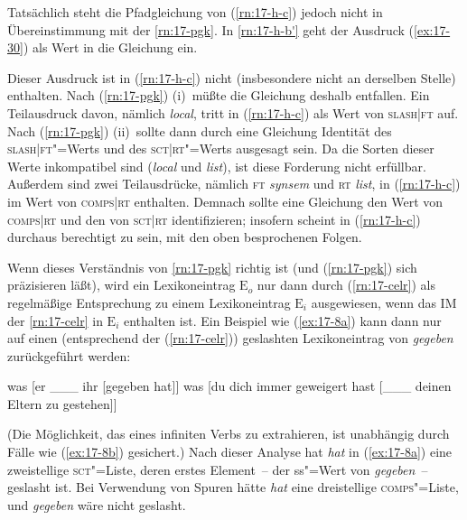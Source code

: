\documentclass[output=paper]{LSP/langsci}
\begin{document}
\randnum\label{rn:17-63}Tatsächlich steht die Pfadgleichung  von (\ref{rn:17-h-c}) jedoch nicht in Übereinstimmung mit der \eqref{rn:17-pgk}. In \eqref{rn:17-h-b'} geht der Ausdruck (\ref{ex:17-30}) als Wert in die Gleichung  ein.
\begin{exe}
\ex\label{ex:17-30}
\end{exe}
Dieser Ausdruck ist in (\ref{rn:17-h-c}) nicht (insbesondere nicht an derselben Stelle) enthalten. Nach (\ref{rn:17-pgk}) (i)~müßte die Gleichung  deshalb entfallen. Ein Teilausdruck davon, nämlich  {\glqq}\textit{local}{\grqq}, tritt in (\ref{rn:17-h-c}) als Wert von \textsc{slash|ft} auf. Nach (\ref{rn:17-pgk}) (ii)~sollte dann durch eine Gleichung  Identität des \textsc{slash|ft}"=Werts und des \textsc{sct|rt}"=Werts
ausgesagt sein. Da die Sorten dieser Werte inkompatibel sind (\textit{local} und \textit{list}), ist diese Forderung nicht erfüllbar. Außerdem sind zwei Teilausdrücke, nämlich {\glqq}\textsc{ft} \textit{synsem}{\grqq} und {\glqq}\textsc{rt} \textit{list}{\grqq}, in (\ref{rn:17-h-c}) im Wert von
\textsc{comps|rt} enthalten. Demnach sollte eine Gleichung den Wert von \textsc{comps|rt} und den von \textsc{sct|rt} identifizieren; insofern scheint  in (\ref{rn:17-h-c}) durchaus berechtigt zu sein, mit den oben besprochenen Folgen.

\randnum\label{rn:17-64}Wenn dieses Verständnis von \eqref{rn:17-pgk} richtig ist (und (\ref{rn:17-pgk}) sich präzisieren läßt), wird ein Lexikoneintrag $\mathrm{E}_o$ nur dann
durch (\ref{rn:17-celr}) als regelmäßige Entsprechung zu einem Lexikoneintrag
$\mathrm{E}_i$ ausgewiesen, wenn das IM der \eqref{rn:17-celr} in $\mathrm{E}_i$
enthalten ist. Ein Beispiel wie (\ref{ex:17-8a}) kann dann nur auf einen (entsprechend der (\ref{rn:17-celr})) geslashten Lexikoneintrag von \textit{gegeben} zurückgeführt werden:
\hack{\enlargethispage{-\baselineskip}}
\begin{exe}
\ex
\label{ex:17-8}
\begin{xlist}
\ex
\label{ex:17-8a}
was [er \_\_\_ ihr [gegeben hat]]
\ex
\label{ex:17-8b}
was [du dich immer geweigert hast [\_\_\_ deinen Eltern zu gestehen]]
\end{xlist}
\end{exe}
(Die Möglichkeit, das  eines infiniten Verbs zu extrahieren,
ist unabhängig durch Fälle wie (\ref{ex:17-8b}) gesichert.) Nach dieser Analyse
hat \textit{hat} in (\ref{ex:17-8a}) eine zweistellige \textsc{sct}"=Liste, deren erstes Element~--
der ss"=Wert von \textit{gegeben}~-- geslasht ist. Bei Verwendung von Spuren hätte
\textit{hat} eine dreistellige \textsc{comps}"=Liste, und \textit{gegeben} wäre nicht geslasht.
\end{document}
